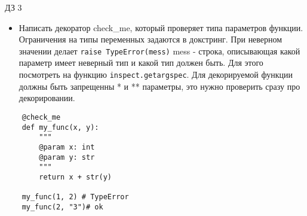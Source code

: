 \documentclass{article}
\begin{document}
\begin{center} ДЗ 3 \end{center}
\begin{itemize}
    \item Написать декоратор check\_me, который проверяет типа параметров функции.
        Ограничения на типы переменных задаются в докстринг. При неверном
        значении делает \lstinline!raise TypeError(mess)! mess - строка,
        описывающая какой параметр имеет неверный тип и какой тип должен быть.
        Для этого посмотреть на функцию \lstinline!inspect.getargspec!.
        Для декорируемой функции должны быть запрещенны * и ** параметры, это
        нужно проверить сразу про декорировании.
\end{itemize}

\vspace{15pt}
\begin{lstlisting}
    @check_me
    def my_func(x, y):
        """
        @param x: int
        @param y: str
        """
        return x + str(y)

    my_func(1, 2) # TypeError
    my_func(2, "3")# ok
\end{lstlisting}
\newpage

\end{document}

